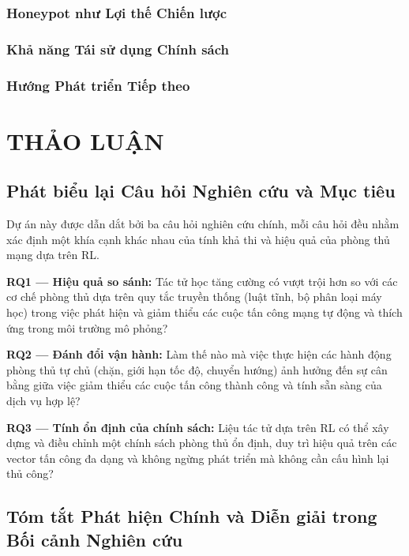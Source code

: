 \documentclass[12pt,a4paper,twoside]{report}
\begin{document}
\subsection{Honeypot như Lợi thế Chiến lược}

\subsection{Khả năng Tái sử dụng Chính sách}

\subsection{Hướng Phát triển Tiếp theo}

\chapter{THẢO LUẬN}

\section{Phát biểu lại Câu hỏi Nghiên cứu và Mục tiêu}

Dự án này được dẫn dắt bởi ba câu hỏi nghiên cứu chính, mỗi câu hỏi đều nhằm xác định một khía cạnh khác nhau của tính khả thi và hiệu quả của phòng thủ mạng dựa trên RL.

\textbf{RQ1 --- Hiệu quả so sánh:} Tác tử học tăng cường có vượt trội hơn so với các cơ chế phòng thủ dựa trên quy tắc truyền thống (luật tĩnh, bộ phân loại máy học) trong việc phát hiện và giảm thiểu các cuộc tấn công mạng tự động và thích ứng trong môi trường mô phỏng?

\textbf{RQ2 --- Đánh đổi vận hành:} Làm thế nào mà việc thực hiện các hành động phòng thủ tự chủ (chặn, giới hạn tốc độ, chuyển hướng) ảnh hưởng đến sự cân bằng giữa việc giảm thiểu các cuộc tấn công thành công và tính sẵn sàng của dịch vụ hợp lệ?

\textbf{RQ3 --- Tính ổn định của chính sách:} Liệu tác tử dựa trên RL có thể xây dựng và điều chỉnh một chính sách phòng thủ ổn định, duy trì hiệu quả trên các vector tấn công đa dạng và không ngừng phát triển mà không cần cấu hình lại thủ công?

\section{Tóm tắt Phát hiện Chính và Diễn giải trong Bối cảnh Nghiên cứu}
\end{document}
